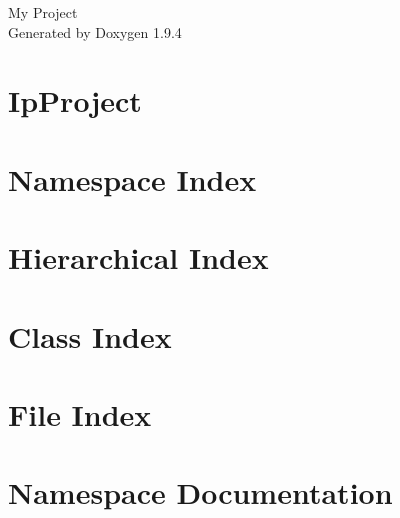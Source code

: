 \documentclass[twoside]{book}
\newcommand{\+}{\discretionary{\mbox{\scriptsize$\hookleftarrow$}}{}{}}
\newcommand{\clearemptydoublepage}{%
    \newpage{\pagestyle{empty}\cleardoublepage}%
  }
\begin{document}
  \raggedbottom
    \hypersetup{pageanchor=false,
                bookmarksnumbered=true,
                pdfencoding=unicode
               }
  \begin{titlepage}
  \vspace*{7cm}
  \begin{center}%
  {\Large My Project}\\
  \vspace*{1cm}
  {\large Generated by Doxygen 1.9.4}\\
  \end{center}
  \end{titlepage}
  \clearemptydoublepage
  \tableofcontents
  \clearemptydoublepage
  \hypersetup{pageanchor=true}
\chapter{Ip\+Project}
\label{md__r_e_a_d_m_e}

\chapter{Namespace Index}

\chapter{Hierarchical Index}

\chapter{Class Index}

\chapter{File Index}

\chapter{Namespace Documentation}












\end{document}
